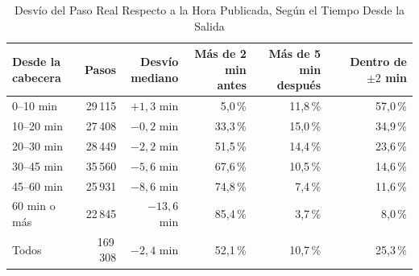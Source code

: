 \begin{table}[ht]
\centering
\caption{Desvío del Paso Real Respecto a la Hora Publicada, Según el Tiempo Desde la Salida}\label{tab:desvio-horario}
\begin{tabular}{@{}lrrrrr@{}}
\toprule
\shortstack[l]{Desde la\\cabecera} & Pasos & \shortstack{Desvío\\mediano} & \shortstack{Más de 2 min\\antes} & \shortstack{Más de 5 min\\después} & \shortstack{Dentro de\\$\pm2$ min}\\
\midrule
0--10 min   & 29\,115 & $+1{,}3$ min  & 5,0\,\%  & 11,8\,\% & 57,0\,\%\\
10--20 min  & 27\,408 & $-0{,}2$ min  & 33,3\,\% & 15,0\,\% & 34,9\,\%\\
20--30 min  & 28\,449 & $-2{,}2$ min  & 51,5\,\% & 14,4\,\% & 23,6\,\%\\
30--45 min  & 35\,560 & $-5{,}6$ min  & 67,6\,\% & 10,5\,\% & 14,6\,\%\\
45--60 min  & 25\,931 & $-8{,}6$ min  & 74,8\,\% & 7,4\,\%  & 11,6\,\%\\
60 min o más & 22\,845 & $-13{,}6$ min & 85,4\,\% & 3,7\,\%  & 8,0\,\%\\
\midrule
Todos       & 169\,308 & $-2{,}4$ min & 52,1\,\% & 10,7\,\% & 25,3\,\%\\
\bottomrule
\end{tabular}
\end{table}

